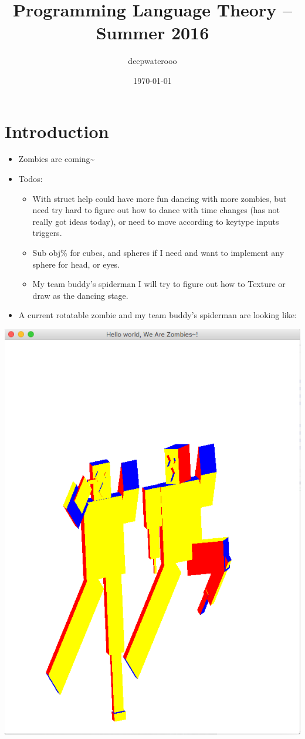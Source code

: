 \documentclass[9pt,b5paper]{article}
\author{deepwaterooo}
\date{\today}
\title{Programming Language Theory -- Summer 2016}
\begin{document}
\maketitle
\tableofcontents


\section{Introduction}
\label{sec-1}
\begin{itemize}
\item Zombies are coming\textasciitilde{}
\item Todos: 
\begin{itemize}
\item With struct help could have more fun dancing with more zombies, but need try hard to figure out how to dance with time changes (has not really got ideas today), or need to move according to keytype inputs triggers.
\item Sub obj\% for cubes, and spheres if I need and want to implement any sphere for head, or eyes.
\item My team buddy's spiderman I will try to figure out how to Texture or draw as the dancing stage.
\end{itemize}
\item A current rotatable zombie and my team buddy's spiderman are looking like:
\end{itemize}

\includegraphics[width=.9\linewidth]{./pic/Screen_Shot_2016-05-28_at_3_13_17_AM.png}
\end{document}
